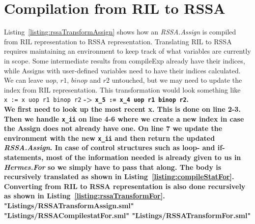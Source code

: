 \section{Compilation from RIL to RSSA}
Listing~\ref{listing:rssaTransformAssign} shows how an \emph{RSSA.Assign} is compiled from RIL representation to RSSA representation.
Translating RIL to RSSA requires maintaining an environment to keep track of what variables are currently in scope.
Some intermediate results from compileExp already have their indices, while Assigns with user-defined variables need to have their indices calculated.
We can leave $uop$, $r1$, $binop$ and $r2$ untouched, but we may need to update the index from RIL representation. This transformation would look something like \\
\lstinline{x := x uop r1 binop r2} \bf{->} \lstinline{x_5 := x_4 uop r1 binop r2}. \\
We first need to look up the most recent x.
This is done on line 2-3. Then we handle \lstinline{x_ii} on line 4-6 where we create a new index in case the Assign does not already have one.
On line 7 we update the environment with the new \lstinline{x_ii} and then return the updated \emph{RSSA.Assign}.
In case of control structures such as loop- and if-statements, most of the information needed is already given to us in \emph{Hermes.For} so we simply have to pass that along.
The body is recursively translated as shown in Listing~\ref{listing:compileStatFor}.
Converting from RIL to RSSA representation is also done recursively as shown in Listing~\ref{listing:rssaTransformFor}.
 {"Listings/RSSATransformAssign.sml"}
 {"Listings/RSSACompilestatFor.sml"}
 {"Listings/RSSATransformFor.sml"}

